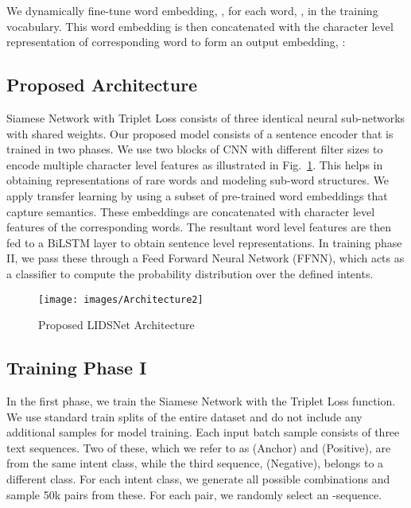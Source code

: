 \documentclass[conference]{IEEEtran}
\begin{document}
We dynamically fine-tune word embedding, , for each word, , in the training vocabulary. This word embedding is then concatenated with the character level representation of corresponding word to form an output embedding, :


\subsection{Proposed Architecture}\label{sec:proposedArchitecture}

Siamese Network \cite{Chicco2021} with Triplet Loss \cite{7298682} consists of three identical neural sub-networks with shared weights. Our proposed model consists of a sentence encoder that is trained in two phases. We use two blocks of CNN with different filter sizes to encode multiple character level features as illustrated in Fig.~\ref{fig:proposedArchitecture}. This helps in obtaining representations of rare words \cite{bojanowski-etal-2017-enriching} and modeling sub-word structures. We apply transfer learning by using a subset of pre-trained word embeddings that capture semantics. These embeddings are concatenated with character level features of the corresponding words. The resultant word level features are then fed to a BiLSTM layer to obtain sentence level representations. In training phase II, we pass these through a Feed Forward Neural Network (FFNN), which acts as a classifier to compute the probability distribution over the defined intents.

\begin{figure}[t]
	\centering
	\texttt{[image: images/Architecture2]}
	\caption{Proposed LIDSNet Architecture}
	\label{fig:proposedArchitecture}
\end{figure}

\subsection{Training Phase I}\label{sec:trainingPhaseI}

In the first phase, we train the Siamese Network with the Triplet Loss function. We use standard train splits of the entire dataset and do not include any additional samples for model training. Each input batch sample consists of three text sequences. Two of these, which we refer to as  (Anchor) and  (Positive), are from the same intent class, while the third sequence,  (Negative), belongs to a different class. For each intent class, we generate all possible  combinations and sample 50k pairs from these. For each  pair, we randomly select an -sequence.
\end{document}
